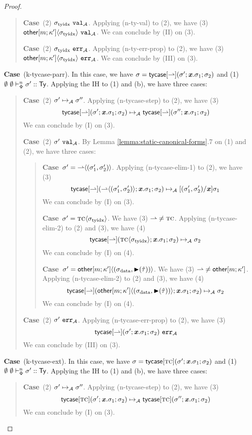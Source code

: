 \documentclass[12pt]{article}
\newcommand{\pfcase}[1]{\textbf{Case}~#1. }
\begin{document}
\begin{proof}
\begin{quote}
    \pfcase{(2) $\sigma_\text{tyidx}~\mathtt{val}_{\mathcal{A}}$} Applying (n-ty-val) to (2), we have (3) ${{\sf other}[m; \kappa']}\langle\sigma_\text{tyidx}\rangle~\mathtt{val}_{\mathcal{A}}$. We can conclude by (II) on (3).

    \pfcase{(2) $\sigma_\text{tyidx}~\mathtt{err}_{\mathcal{A}}$} Applying (n-ty-err-prop) to (2), we have (3) ${{\sf other}[m; \kappa']}\langle\sigma_\text{tyidx}\rangle~\mathtt{err}_{\mathcal{A}}$. We can conclude by (III) on (3).
\end{quote}

\pfcase{(k-tycase-parr)} In this case, we have $\sigma={\sf tycase}[\rightharpoonup](\sigma'; {\textbf{\textit{x}}}.\sigma_1; \sigma_2)$ and (1) $\emptyset~\emptyset \vdash_{\Phi}^{n} \sigma' :: {\sf Ty}$. Applying the IH to (1) and (b), we have three cases:
\begin{quote}
    \pfcase{(2) $\sigma' \mapsto_{\mathcal{A}} \sigma''$} Applying (n-tycase-step) to (2), we have (3) $${\sf tycase}[{\rightharpoonup}](\sigma'; {\textbf{\textit{x}}}.\sigma_1; \sigma_2) \mapsto_{\mathcal{A}} {\sf tycase}[\rightharpoonup](\sigma''; {\textbf{\textit{x}}}.\sigma_1; \sigma_2)$$ We can conclude by (I) on (3).

    \pfcase{(2) $\sigma'~\mathtt{val}_{\mathcal{A}}$} By Lemma \ref{lemma:static-canonical-forms}.7 on (1) and (2), we have three cases: 
    \begin{quote}
        \pfcase{$\sigma'={\rightharpoonup}\langle(\sigma_1', \sigma_2')\rangle$} Applying (n-tycase-elim-1) to (2), we have (3) $${\sf tycase}[\rightharpoonup]({\rightharpoonup}\langle(\sigma_1', \sigma_2')\rangle; {\textbf{\textit{x}}}.\sigma_1; \sigma_2) \mapsto_{\mathcal{A}} [(\sigma_1', \sigma_2')/{\textbf{\textit{x}}}]\sigma_1$$ We can conclude by (I) on (3).

        \pfcase{$\sigma'={\textsc{tc}}\langle\sigma_\text{tyidx}\rangle$} We have (3) ${\rightharpoonup}\neq\textsc{tc}$. Applying (n-tycase-elim-2) to (2) and (3), we have (4) $${\sf tycase}[\rightharpoonup]({\textsc{tc}}\langle\sigma_\text{tyidx}\rangle; {\textbf{\textit{x}}}.\sigma_1; \sigma_2) \mapsto_{\mathcal{A}} \sigma_2$$ We can conclude by (I) on (4).

        \pfcase{$\sigma'={{\sf other}[m; \kappa']}\langle(\sigma_\text{data}, {\blacktriangleright}(\hat{\tau}))\rangle$} We have  (3) ${\rightharpoonup}\neq{\sf other}[m; \kappa']$. Applying (n-tycase-elim-2) to (2) and (3), we have (4) $${\sf tycase}[\rightharpoonup]({{\sf other}[m; \kappa']}\langle(\sigma_\text{data}, {\blacktriangleright}(\hat{\tau}))\rangle; {\textbf{\textit{x}}}.\sigma_1; \sigma_2) \mapsto_{\mathcal{A}} \sigma_2$$ We can conclude by (I) on (4).
    \end{quote}

    \pfcase{(2) $\sigma'~\mathtt{err}_{\mathcal{A}}$} Applying (n-tycase-err-prop) to (2), we have (3) $${\sf tycase}[\rightharpoonup](\sigma'; {\textbf{\textit{x}}}.\sigma_1; \sigma_2)~\mathtt{err}_{\mathcal{A}}$$ We can conclude by (III) on (3). 
\end{quote}

\pfcase{(k-tycase-ext)} In this case, we have $\sigma={\sf tycase}[\textsc{tc}](\sigma'; {\textbf{\textit{x}}}.\sigma_1; \sigma_2)$ and (1) $\emptyset~\emptyset \vdash_{\Phi}^{n} \sigma' :: {\sf Ty}$. Applying the IH to (1) and (b), we have  three cases:
\begin{quote}
    \pfcase{(2) $\sigma' \mapsto_{\mathcal{A}} \sigma''$} Applying (n-tycase-step) to (2), we have (3) $${\sf tycase}[{\textsc{tc}}](\sigma'; {\textbf{\textit{x}}}.\sigma_1; \sigma_2) \mapsto_{\mathcal{A}} {\sf tycase}[\textsc{tc}](\sigma''; {\textbf{\textit{x}}}.\sigma_1; \sigma_2)$$ We can conclude by (I) on (3).


\end{quote}
\end{proof}
\end{document}
